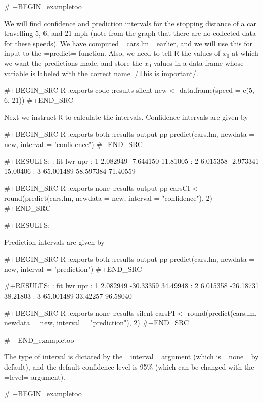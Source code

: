 # +BEGIN_exampletoo

We will find confidence and prediction intervals for the stopping
distance of a car travelling 5, 6, and 21 mph (note from the graph
that there are no collected data for these speeds). We have computed
=cars.lm= earlier, and we will use this for input to the =predict=
function. Also, we need to tell \(\mathsf{R}\) the values of \(x_{0}\)
at which we want the predictions made, and store the \(x_{0}\) values
in a data frame whose variable is labeled with the correct name. /This
is important/.

#+BEGIN_SRC R :exports code :results silent
new <- data.frame(speed = c(5, 6, 21))
#+END_SRC

Next we instruct \(\mathsf{R}\) to calculate the intervals. Confidence
intervals are given by

#+BEGIN_SRC R :exports both :results output pp 
predict(cars.lm, newdata = new, interval = "confidence")
#+END_SRC

#+RESULTS:
:         fit       lwr      upr
: 1  2.082949 -7.644150 11.81005
: 2  6.015358 -2.973341 15.00406
: 3 65.001489 58.597384 71.40559

#+BEGIN_SRC R :exports none :results output pp 
carsCI <- round(predict(cars.lm, newdata = new, interval = "confidence"), 2)
#+END_SRC

#+RESULTS:

Prediction intervals are given by

#+BEGIN_SRC R :exports both :results output pp 
predict(cars.lm, newdata = new, interval = "prediction")
#+END_SRC

#+RESULTS:
:         fit       lwr      upr
: 1  2.082949 -30.33359 34.49948
: 2  6.015358 -26.18731 38.21803
: 3 65.001489  33.42257 96.58040

#+BEGIN_SRC R :exports none :results silent
carsPI <- round(predict(cars.lm, newdata = new, interval = "prediction"), 2)
#+END_SRC

# +END_exampletoo


The type of interval is dictated by the =interval= argument (which is
=none= by default), and the default confidence level is 95\% (which
can be changed with the =level= argument).

# +BEGIN_exampletoo

